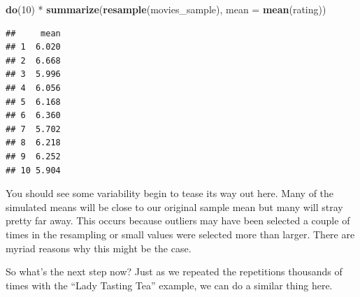 \documentclass[]{tufte-book}
\newenvironment{Shaded}{\begin{snugshade}}{\end{snugshade}}
\newcommand{\KeywordTok}[1]{\textcolor[rgb]{0.13,0.29,0.53}{\textbf{{#1}}}}
\newcommand{\DataTypeTok}[1]{\textcolor[rgb]{0.13,0.29,0.53}{{#1}}}
\newcommand{\DecValTok}[1]{\textcolor[rgb]{0.00,0.00,0.81}{{#1}}}
\newcommand{\StringTok}[1]{\textcolor[rgb]{0.31,0.60,0.02}{{#1}}}
\newcommand{\NormalTok}[1]{{#1}}
\begin{document}
\begin{Shaded}
\begin{Highlighting}[]
\KeywordTok{do}\NormalTok{(}\DecValTok{10}\NormalTok{) *}\StringTok{ }\KeywordTok{summarize}\NormalTok{(}\KeywordTok{resample}\NormalTok{(movies_sample), }\DataTypeTok{mean =} \KeywordTok{mean}\NormalTok{(rating))}
\end{Highlighting}
\end{Shaded}

\begin{verbatim}
##     mean
## 1  6.020
## 2  6.668
## 3  5.996
## 4  6.056
## 5  6.168
## 6  6.360
## 7  5.702
## 8  6.218
## 9  6.252
## 10 5.904
\end{verbatim}

You should see some variability begin to tease its way out here. Many of
the simulated means will be close to our original sample mean but many
will stray pretty far away. This occurs because outliers may have been
selected a couple of times in the resampling or small values were
selected more than larger. There are myriad reasons why this might be
the case.

So what's the next step now? Just as we repeated the repetitions
thousands of times with the ``Lady Tasting Tea'' example, we can do a
similar thing here.

\begin{Shaded}
\end{Shaded}
\end{document}
